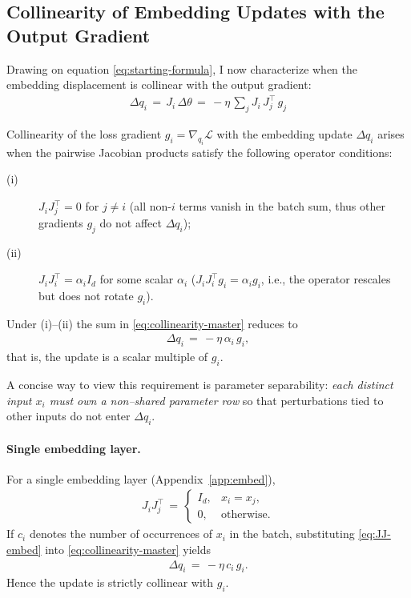 \subsection{Collinearity of Embedding Updates with the Output Gradient}

Drawing on equation \eqref{eq:starting-formula}, I now characterize when the embedding displacement is collinear with the output gradient: 
\begin{align}
\Delta q_{i} \,=\, J_{i}\,\Delta\theta \,=\, -\eta\,\sum_{j} J_{i}\,J_{j}^{\!\top}\,g_{j} \label{eq:collinearity-master}
\end{align}

Collinearity of the loss gradient $g_i = \nabla_{q_i}\mathcal{L}$ with the embedding update $\Delta q_i$ arises when the pairwise Jacobian products satisfy the following operator conditions:
\begin{description}
\item[(i)] $J_{i}J_{j}^{\!\top}=0$ for $j\neq i$ (all non-$i$ terms vanish in the batch sum, thus other gradients $g_j$ do not affect $\Delta q_i$);
\item[(ii)] $J_{i}J_{i}^{\!\top}=\alpha_i I_d$ for some scalar $\alpha_i$ ($J_{i}J_{i}^{\!\top}g_i=\alpha_i g_i$, i.e., the operator rescales but does not rotate $g_i$).
\end{description}
Under (i)–(ii) the sum in \eqref{eq:collinearity-master} reduces to
\begin{align}
\Delta q_i \,=\, -\eta\,\alpha_i\, g_i,
\end{align}
that is, the update is a scalar multiple of $g_i$.

A concise way to view this requirement is parameter separability: \emph{each distinct input $x_i$ must own a non–shared parameter row} so that perturbations tied to other inputs do not enter $\Delta q_i$.

\paragraph{Single embedding layer.}
For a single embedding layer (Appendix~\ref{app:embed}),
\begin{align}
J_{i}J_{j}^{\!\top} \,=\, \begin{cases}
I_d, & x_i = x_j, \\
0, & \text{otherwise.}
\end{cases} \label{eq:JJ-embed}
\end{align}
If $c_i$ denotes the number of occurrences of $x_i$ in the batch, substituting \eqref{eq:JJ-embed} into \eqref{eq:collinearity-master} yields
\begin{align}
\Delta q_i \,=\, -\eta\,c_i\,g_i.
\end{align}
Hence the update is strictly collinear with $g_i$.

